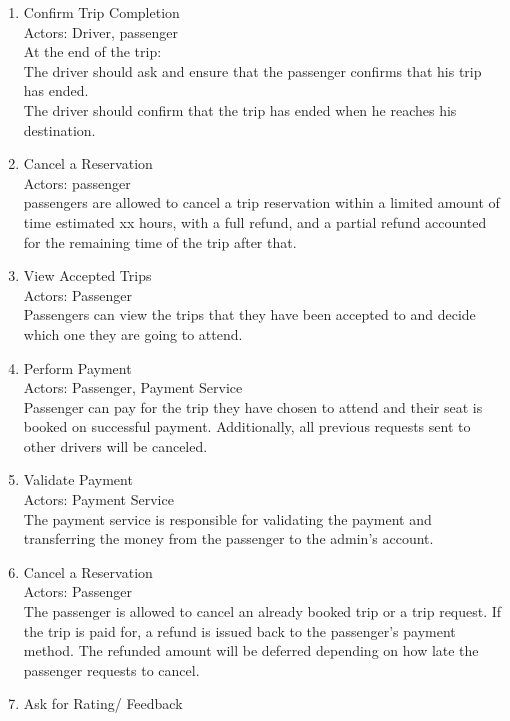 \documentclass[a4paper, 12pt]{report} %
\begin{document}
\begin{enumerate}
                \item Confirm Trip Completion\\
                    Actors: Driver, passenger\\
                    At the end of the trip: \\
                        The driver should ask and ensure that the passenger confirms that his trip has ended. \\
                        The driver should confirm that the trip has ended when he reaches his destination.
                \item Cancel a Reservation\\
                    Actors: passenger\\
                    passengers are allowed to cancel a trip reservation within a limited amount of time estimated xx hours, with a full refund, and a partial refund accounted for the remaining time of the trip after that.
                \item View Accepted Trips\\
                    Actors: Passenger\\
                    Passengers can view the trips that they have been accepted to and decide which one they are going to attend.
                \item Perform Payment \\
                    Actors: Passenger, Payment Service \\
                    Passenger can pay for the trip they have chosen to attend and their seat is booked on successful payment. Additionally, all previous requests sent to other drivers will be canceled.
                \item Validate Payment \\
                    Actors: Payment Service \\
                    The payment service is responsible for validating the payment and transferring the money from the passenger to the admin’s account.
                \item Cancel a Reservation\\
                    Actors: Passenger \\
                    The passenger is allowed to cancel an already booked trip or a trip request. If the trip is paid for, a refund is issued back to the passenger’s payment method. The refunded amount will be deferred depending on how late the passenger requests to cancel.
                \item Ask for Rating/ Feedback\\

\end{enumerate}
\end{document}
